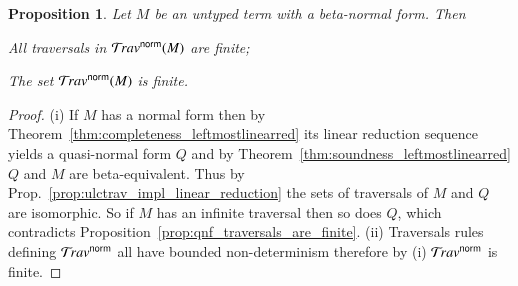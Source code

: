 \documentclass{elsarticle}
\theoremstyle{plain}
\newtheorem{proposition}[theorem]{Proposition}
\theoremstyle{definition}
\theoremstyle{remark}
\newcommand{\normalizing}{{\sf norm}}
\newcommand{\travsetnorm}{\travset^\normalizing}
\begin{document}
\begin{proposition}
\label{prop:ulc_travnorm_finite}
Let $M$ be an untyped term with a beta-normal form. Then
\begin{enumerate*}[label=(\roman*)]
\item All traversals in $\travsetnorm(M)$ are finite;
\item The set $\travsetnorm(M)$ is finite.
\end{enumerate*}
\end{proposition}
\begin{proof}
(i) If $M$ has a normal form then by Theorem~\ref{thm:completeness_leftmostlinearred} its linear reduction sequence yields a quasi-normal form $Q$ and by Theorem~\ref{thm:soundness_leftmostlinearred} $Q$ and $M$ are beta-equivalent. Thus by Prop.~\ref{prop:ulctrav_impl_linear_reduction} the sets of traversals of $M$ and $Q$ are isomorphic. So if $M$ has an infinite traversal then so does $Q$, which contradicts Proposition~\ref{prop:qnf_traversals_are_finite}.
(ii) Traversals rules defining $\travsetnorm$ all have bounded non-determinism therefore by (i) $\travsetnorm$ is finite.
\end{proof}

\end{document}
